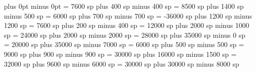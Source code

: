 %
%
%


\grezerowidthspace=0pt plus 0pt minus 0pt
\greinterglyphspace = 7600 sp plus 400 sp minus 400 sp
\grealterationspace = 8500 sp plus 1400 sp minus 500 sp
\clefflatspace = 6000 sp plus 700 sp minus 700 sp
\grebeforealterationspace = -36000 sp plus 1200 sp minus 1200 sp
\greinterelementspace = 7600 sp plus 200 sp minus 400 sp
\grelargerspace = 12000 sp plus 2000 sp minus 1000 sp
\greglyphspace = 24000 sp plus 2000 sp minus 2000 sp
\greintersyllablespace= 28000 sp plus 35000 sp minus 0 sp
\grespacebeforecusto = 20000 sp plus 35000 sp minus 7000 sp
\grespacebeforesigns= 6000 sp plus 500 sp minus 500 sp
\grespaceaftersigns= 9000 sp plus 900 sp minus 900 sp
\grespaceafterlineclef = 30000 sp plus 16000 sp minus 1500 sp
\greinterwordspacenotes = 32000 sp plus 9600 sp minus 6000 sp
\greinterwordspacenotestext = 30000 sp plus 30000 sp minus 8000 sp
